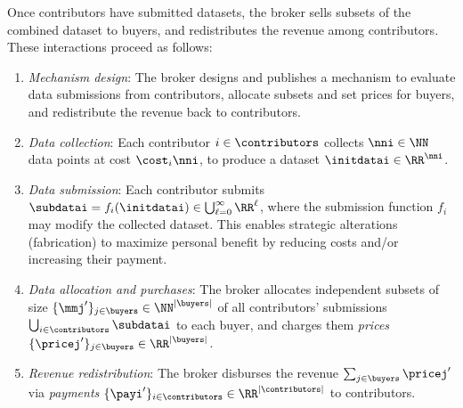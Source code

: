 Once contributors have submitted datasets, the broker sells subsets of the combined dataset to buyers, and redistributes the revenue among contributors. These interactions proceed as follows:
\vspace{-0.15in}
\begin{enumerate} [leftmargin=0.16in]
    \item \emph{Mechanism design}:
    \label{itm:mechanismdesign}
    The broker designs and publishes a mechanism  to evaluate data submissions from
contributors, allocate subsets and set prices for buyers, and redistribute the revenue back to contributors.
\vspace{-0.10in}
    \item \emph{Data collection}:
    \label{itm:datacollection}
Each contributor $i \in \contributors$ collects $\nni \in \NN$ data points at cost $\cost_i \nni$, to produce a dataset $\initdatai \in \RR^{\nni}$.
\vspace{-0.1in}
    \item \emph{Data submission}:
    \label{itm:datasubmission}
    Each contributor submits $\subdatai = f_i(\initdatai) \in \bigcup_{\ell=0}^\infty \RR^\ell$, where the submission function $f_i$ may modify the collected dataset. This enables strategic
alterations (\eg fabrication) to maximize personal benefit by reducing costs and/or
increasing their payment. \hspace{-0.5in}
\vspace{-0.26in}

    \item \emph{Data allocation and purchases}:
    \label{itm:pricing}
     The broker allocates independent subsets of size
     $\{\mmj'\}_{j\in\buyers} \in \NN^{|\buyers|}$ of
     all contributors' submissions $\bigcup_{i\in\contributors}\subdatai$
     to each buyer, and charges them \emph{prices} $\{\pricej'\}_{j \in \buyers}\in\RR^{|\buyers|}$.
    

\vspace{-0.1in}
    \item \emph{Revenue redistribution}: \hspace{-0.05in}
    \label{itm:revenueredistribution}
    The broker disburses the revenue $\sum_{j \in \buyers} \pricej'$ via \emph{payments} $\{\payi'\}_{i \in \contributors} \in \RR^{|\contributors|}$  to contributors.
\end{enumerate}


